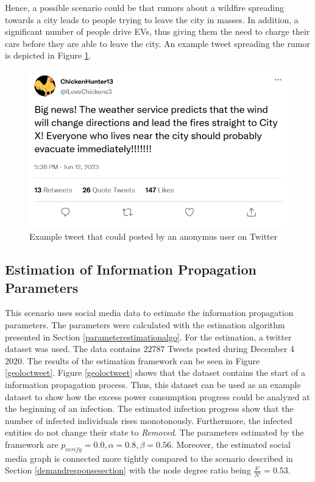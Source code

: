 Hence, a possible scenario could be that 
rumors about a wildfire spreading towards a city leads to people
trying to leave the city in masses. In addition, a significant 
number of people drive EVs, thus giving them the need to charge
their cars before they are able to leave the city. An example
tweet spreading the rumor is depicted in Figure \ref{firetweet}.

\begin{figure}[!ht]
    \center
    \includegraphics[scale=.4]{figs/firenews.png}
    \caption{Example tweet that could posted by an anonymus user on Twitter}
    \label{firetweet}
\end{figure}

\subsection{Estimation of Information Propagation Parameters}

This scenario uses social media data to estimate the information 
propagation parameters.
The parameters were calculated with 
the estimation algorithm 
presented in Section \ref{parameterestimationalgo}. 
For the estimation, a 
twitter dataset was used.
The data contains $22787$ Tweets posted during December 4 2020.
The results of the estimation framework can be seen in 
Figure \ref{geoloctweet}. Figure \ref{geoloctweet} shows 
that the dataset contains the start of a 
information propagation process.
Thus, this dataset can be used as an example dataset 
to show how the excess power consumption progress 
could be analyzed at the beginning of an infection.
The estimated infection progress show that the number of infected
individuals rises monotonously. Furthermore, the infected 
entities do not change their state to \textit{Removed}.
The parameters estimated by the framework are 
$p_{verify}= 0.0, \alpha = 0.8, \beta = 0.56$.
Moreover, the estimated social media graph is 
connected more tightly compared to the 
scenario described in Section \ref{demandresponsesection} 
with the node degree ratio being 
$\frac{k'}{N'}=0.53$. 


